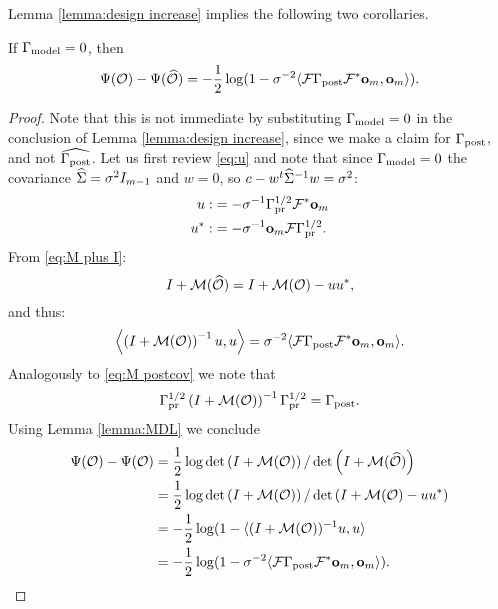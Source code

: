 \documentclass{amsart}
\numberwithin{equation}{section}
\begin{document}
Lemma \ref{lemma:design increase} implies the following two corollaries.
\begin{corollary}\label{cor:zero mod err}
  If $\Gamma_{\textup{model}} = 0$, then
  \begin{equation*}
    \Psi( \mathcal{O} ) - \Psi (\widehat{\mathcal{O}} )
    = -\frac12 \log (1 - \sigma^{-2} \langle \mathcal{F} \Gamma_{\textup{post}} \mathcal{F}^* \mathbf{o}_m, \mathbf{o}_m \rangle ).
  \end{equation*}
\end{corollary}
\begin{proof}
  Note that this is not immediate by substituting $\Gamma_{\textup{model}} = 0$ in the
  conclusion of Lemma \ref{lemma:design increase}, since we make a
  claim for $\Gamma_{\textup{post}}$, and not $\widehat{\Gamma_{\textup{post}}}$. Let us first review
  \eqref{eq:u} and note that since $\Gamma_{\textup{model}} = 0$ the covariance
  $\widehat{\Sigma} = \sigma^2I_{m-1}$ and $w = 0$, so $c - w^t\widehat{\Sigma}^{-1}w =
  \sigma^2$:
  \begin{align*}
    u :&=-\sigma^{-1}\Gamma_{\textup{pr}}^{1/2} \mathcal{F}^* \mathbf{o}_m\\
    u^* :&= -\sigma^{-1} \mathbf{o}_m \mathcal{F} \Gamma_{\textup{pr}}^{1/2}.
  \end{align*}
  From \eqref{eq:M plus I}:
  \begin{equation*}
    I + \mathcal{M}(\widehat{\mathcal{O}}) = I +\mathcal{M}(\mathcal{O}) - uu^*,
  \end{equation*}
  and thus:
  \begin{equation*}
    \left \langle \left ( I +\mathcal{M}(\mathcal{O}) \right )^{-1} u, u \right \rangle
    = \sigma^{-2} \langle \mathcal{F} \Gamma_{\textup{post}} \mathcal{F}^* \mathbf{o}_m, \mathbf{o}_m \rangle.
  \end{equation*}
  Analogously to \eqref{eq:M postcov} we note that
  \begin{equation*}
    \Gamma_{\textup{pr}}^{1/2} \left ( I + \mathcal{M}(\mathcal{O}) \right )^{-1} \Gamma_{\textup{pr}}^{1/2} = \Gamma_{\textup{post}}.
  \end{equation*}
  Using Lemma \ref{lemma:MDL} we conclude
  \begin{align*}
    \Psi( \mathcal{O} ) - \Psi( \mathcal{O} )
    &= \frac12 \log \det \left (I +\mathcal{M}(\mathcal{O}) \right ) / \det \left (I + \mathcal{M}(\widehat{\mathcal{O}}) \right ) \\
    &= \frac12 \log \det \left (I +\mathcal{M}(\mathcal{O}) \right ) / \det \left (I + \mathcal{M}(\mathcal{O}) - uu^* \right ) \\
    &=-\frac12 \log (1 - \langle (I+\mathcal{M}(\mathcal{O}))^{-1}u, u \rangle \\
    &= -\frac12 \log (1 - \sigma^{-2} \langle \mathcal{F} \Gamma_{\textup{post}} \mathcal{F}^* \mathbf{o}_m, \mathbf{o}_m \rangle ).
  \end{align*}
\end{proof}
\end{document}
